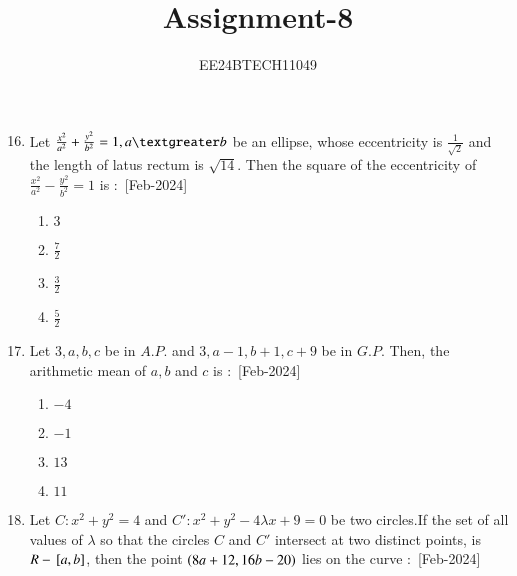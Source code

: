 \documentclass[journal]{IEEEtran}
\begin{document}

\vspace{3cm}

\title{Assignment-8}
\author{EE24BTECH11049}

{\let\newpage\relax\maketitle}

\renewcommand{\thefigure}{\theenumi}
\renewcommand{\thetable}{\theenumi}
\setlength{\intextsep}{10pt} %

\begin{enumerate}
\setcounter{enumi}{15}
    \item Let $\frac{x^2}{a^2}+\frac{y^2}{b^2}=1,a\textgreater b$ be an ellipse, whose eccentricity is $\frac{1}{\sqrt{2}}$ and the length of latus rectum is $\sqrt{14}$. Then the square of the eccentricity of $\frac{x^2}{a^2}-\frac{y^2}{b^2}=1$ is $\colon$
    \hfill{[Feb-2024]}
        \begin{enumerate}
            \item $3$
            \item $\frac{7}{2}$
            \item $\frac{3}{2}$
            \item $\frac{5}{2}$
        \end{enumerate}
    \item Let $3,a,b,c$ be in $A.P.$ and $3,a-1,b+1,c+9$ be in $G.P.$ Then, the arithmetic mean of $a,b$ and $c$ is $\colon$
    \hfill{[Feb-2024]}
        \begin{enumerate}
            \item $-4$
            \item $-1$
            \item $13$
            \item $11$
        \end{enumerate}
    \item Let $C\colon x^2+y^2=4$ and $C\prime\colon x^2+y^2-4\lambda x+9=0$ be two circles.If the set of all values of $\lambda$ so that the circles $C$ and $C\prime$ intersect at two distinct points, is $R-{}\left[a,b\right]$, then the point $\left(8a+12,16b-20\right)$ lies on the curve $\colon$
    \hfill{[Feb-2024]}
        \begin{enumerate}

\end{enumerate}
\end{enumerate}
\end{document}
